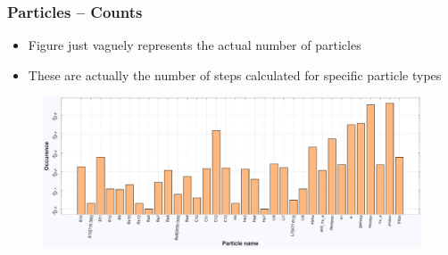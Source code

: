 \begin{frame}
\frametitle{Particles -- Counts}

\begin{block}{}
	\begin{itemize}
		\item Figure just vaguely represents the actual number of particles
		\item These are actually the number of steps calculated for specific particle types
	\end{itemize}
\end{block}

\begin{figure}
	\includegraphics[width=\textwidth]{images/particle_dist_E120_phQGSP_INCLXX_HP.pdf}
\end{figure}

\end{frame}